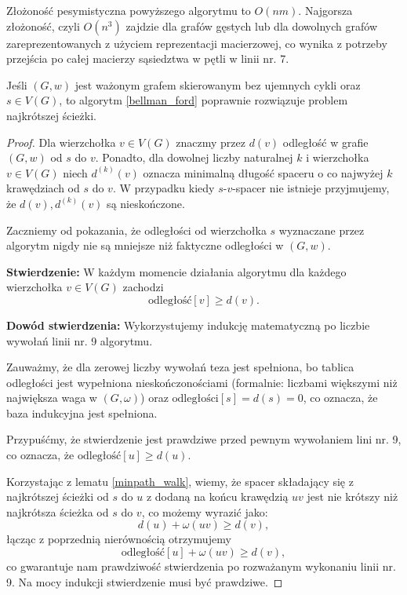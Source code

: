 Złożoność pesymistyczna powyższego algorytmu to $O(nm)$.
Najgorsza złożoność, czyli $O(n^3)$ zajdzie dla grafów 
gęstych lub dla dowolnych grafów
zareprezentowanych z użyciem reprezentacji macierzowej, co wynika
z potrzeby przejścia po całej macierzy sąsiedztwa w pętli w linii nr. 7.

\begin{theorem}
	Jeśli
	$(G, w)$ jest ważonym grafem skierowanym
	bez ujemnych cykli oraz
	$s \in V(G)$, to algorytm \ref{bellman_ford}
	poprawnie rozwiązuje problem najkrótszej ścieżki.
	\begin{proof}
		Dla wierzchołka $v \in V (G)$ znaczmy 
		przez $d(v)$ odległość w grafie
		$(G, w)$ od $s$ do $v$. 
		Ponadto, dla dowolnej liczby
		naturalnej $k$ i 
		wierzchołka $v \in V(G)$ niech 
		$d^{(k)}(v)$ oznacza minimalną długość 
		spaceru o co najwyżej $k$ krawędziach
		od $s$ do $v$. W przypadku kiedy $s$-$v$-spacer
		nie istnieje przyjmujemy, że $d(v), d^{(k)}(v)$
		są nieskończone.
		
		Zaczniemy od pokazania, że odległości 
		od wierzchołka $s$ 
		wyznaczane przez algorytm nigdy nie są mniejsze niż
		faktyczne odległości w $(G, w)$.
		
		\textbf{Stwierdzenie:} W każdym momencie
		działania algorytmu dla każdego wierzchołka
		$v \in V(G)$ zachodzi 
		\[\text{odległość}[v] \geq d(v).\]
		
		\textbf{Dowód stwierdzenia:} Wykorzystujemy
		indukcję matematyczną po liczbie wywołań linii nr. 9 algorytmu. 
		
		Zauważmy, że dla zerowej liczby wywołań teza jest spełniona,
		bo tablica odległości jest wypełniona nieskończonościami 
		(formalnie: liczbami większymi niż największa waga w $(G, \omega)$)
		oraz $\text{odległości}[s]=d(s)=0$, co oznacza, że
		baza indukcyjna jest spełniona.
		
		Przypuśćmy, że stwierdzenie jest prawdziwe przed pewnym
		wywołaniem lini nr. 9, co oznacza, że 
		$\text{odległość}[u] \geq d(u)$. 
		
		Korzystając z lematu 
		\ref{minpath_walk}, wiemy, że spacer składający 
		się z najkrótszej ścieżki od $s$ do $u$ z dodaną 
		na końcu krawędzią $uv$ jest nie krótszy niż 
		najkrótsza ścieżka od $s$ do $v$, co możemy 
		wyrazić jako:
		\[d(u) + \omega(uv) \geq d(v),\]
		łącząc z poprzednią nierównością otrzymujemy
		\[\text{odległość}[u] + \omega(uv) \geq d(v),\]
		co gwarantuje nam prawdziwość stwierdzenia po 
		rozważanym wykonaniu linii nr. 9. Na mocy indukcji stwierdzenie musi być prawdziwe.
		

\end{proof}
\end{theorem}
